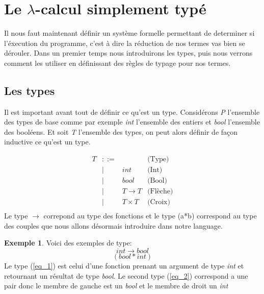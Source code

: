 \documentclass {article}
\newcommand{\codefrom}[3]
           {}
\theoremstyle{definition}
\newtheorem{example}{Exemple}
\theoremstyle{remark}
\newenvironment{bnf}
               {\[\begin{array}{lclr}}
               {\end{array}\]}
\begin{document}
\codefrom{untyped}{lambda}{nat_evaluation}

\section{Le $\lambda$-calcul simplement typé}

Il nous faut maintenant définir un système formelle permettant de determiner si l'éxecution du programme,
c'est à dire la réduction de nos termes vas bien se dérouler. Dans un premier temps nous introduirons les 
types, puis nous verrons comment les utiliser en définissant des règles de typage pour nos termes.

\subsection{Les types}
\label{simple_type}

Il est important avant tout de définir ce qu'est un type.
Considérons \emph{P} l'ensemble des types de base comme par exemple 
\emph{int} l'ensemble des entiers et \emph{bool} l'ensemble des booléens.
Et soit \emph{T} l'ensemble des types, on peut alors définir de façon inductive
ce qu'est un type.

\begin{bnf}
  T &::=& &\mbox{(Type)}\\
  &|&int &\mbox{(Int)}\\ 
  &|&bool &\mbox{(Bool)}\\
  &|&T \rightarrow T &\mbox{(Flèche)}\\
  &|&T \times T &\mbox{(Croix)}\\
\end{bnf}
Le type \(\rightarrow\) correpond au type des fonctions et le type (a*b)
correspond au type des couples que nous allons désormais introduire dans notre language.

\begin{example}
  Voici des exemples de type:
  \begin{equation}
    int \rightarrow bool  \label{eq_1} 
  \end{equation}
  \begin{equation}
    (bool * int) \label{eq_2} 
  \end{equation}
  Le type (\ref{eq_1}) est celui d'une fonction prenant un argument de type \emph{int} et 
  retournant un résultat de type \emph{bool}.
  Le second type (\ref{eq_2}) correspond a une pair donc le membre de gauche est un \emph{bool}
  et le membre de droit un \emph{int}
\end{example}
\end{document}

